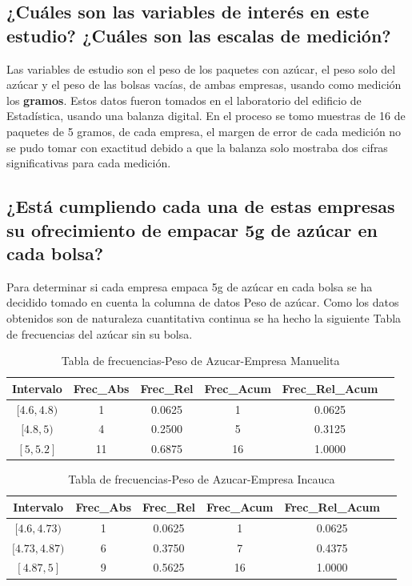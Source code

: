\documentclass[12pt]{article}
\begin{document}
	\subsection{¿Cuáles son las variables de interés en este estudio? ¿Cuáles son las escalas de medición?}
	Las variables de estudio son el peso de los paquetes con azúcar, el peso solo del azúcar y el peso de las bolsas vacías, de ambas empresas, usando como medición los \textbf{gramos}. Estos datos fueron tomados en el laboratorio del edificio de Estadística, usando una balanza digital. En el proceso se tomo muestras de 16 de paquetes de 5 gramos, de cada empresa, el margen de error de cada medición no se pudo tomar con exactitud debido a que la balanza solo mostraba dos cifras significativas para cada medición. 
	
	\subsection{¿Está cumpliendo cada una de estas empresas su ofrecimiento de empacar 5g de azúcar en cada bolsa?}
	Para determinar si cada empresa empaca 5g de azúcar en cada bolsa se ha decidido tomado en cuenta la columna de datos Peso de azúcar.
	Como los datos obtenidos son de naturaleza cuantitativa continua se ha hecho la siguiente Tabla de frecuencias del azúcar sin su bolsa.
	
	\begin{table}[h!]
		\centering
		\begin{tabular}{|c|c|c|c|c|c|}
			\hline
			\textbf{Intervalo} & \textbf{Frec\_Abs} & \textbf{Frec\_Rel} & \textbf{Frec\_Acum} & \textbf{Frec\_Rel\_Acum} \\
			\hline
			$[4.6, 4.8)$ & 1 & 0.0625 & 1 & 0.0625 \\
			\hline
			$[4.8, 5)$ & 4 & 0.2500 & 5 & 0.3125 \\
			\hline
			$[5, 5.2]$ & 11 & 0.6875 & 16 & 1.0000 \\
			\hline
		\end{tabular}
		\caption{Tabla de frecuencias-Peso de Azucar-Empresa Manuelita}
	\end{table}
	
	\begin{table}[h!]
		\centering
		\begin{tabular}{|c|c|c|c|c|c|}
			\hline
			\textbf{Intervalo} & \textbf{Frec\_Abs} & \textbf{Frec\_Rel} & \textbf{Frec\_Acum} & \textbf{Frec\_Rel\_Acum} \\
			\hline
			$[4.6,4.73)$ & 1 & 0.0625 & 1 & 0.0625 \\
			\hline
			$[4.73,4.87)$ & 6 & 0.3750 & 7 & 0.4375 \\
			\hline
			$[4.87,5]$ & 9 & 0.5625 & 16 & 1.0000 \\
			\hline
		\end{tabular}
		\caption{Tabla de frecuencias-Peso de Azucar-Empresa Incauca}
	\end{table}
	
\end{document}
